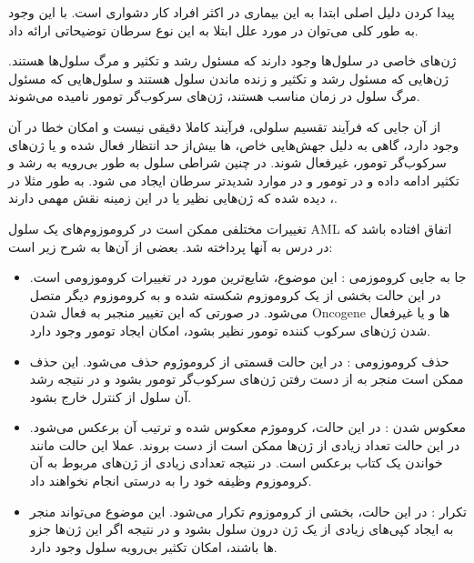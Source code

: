\documentclass[12pt]{article}
\begin{document}
پیدا کردن دلیل اصلی ابتدا به این بیماری در اکثر افراد کار دشواری است. با این وجود به طور کلی می‌توان در مورد علل ابتلا به این نوع سرطان توضیحاتی ارائه داد.

ژن‌های خاصی در سلول‌ها وجود دارند که مسئول رشد و تکثیر و مرگ سلول‌ها هستند. ژن‌هایی که مسئول رشد و تکثیر و زنده ماندن سلول هستند  و سلول‌هایی که مسئول مرگ سلول در زمان مناسب هستند، ژن‌های سرکوب‌گر تومور
نامیده می‌شوند.

از آن جایی که فرآیند تقسیم سلولی،  فرآیند کاملا دقیقی نیست و امکان خطا در آن وجود دارد، گاهی به دلیل جهش‌هایی خاص،  ها بیش‌از حد انتظار فعال شده و یا ژن‌های سرکوب‌گر تومور، غیرفعال شوند. در چنین شراطی سلول به طور بی‌رویه به رشد و تکثیر ادامه داده و در تومور و در موارد شدیدتر سرطان ایجاد می شود. به طور مثلا در ، دیده شده که ژن‌هایی نظیر  یا  در این زمینه نقش مهمی دارند.


تغییرات مختلفی ممکن است در کروموزوم‌های یک سلول AML اتفاق افتاده باشد که در درس به آنها پرداخته شد. بعضی از آن‌ها به شرح زیر است:

\begin{itemize}
	
	\item جا به جایی کروموزمی
	: این موضوع، شایع‌ترین مورد در تغییرات کروموزومی است. در این حالت بخشی از یک کروموزوم شکسته شده و به کروموزوم دیگر متصل می‌شود. در صورتی که این تغییر منجبر به فعال شدن Oncogene ها و یا غیرفعال شدن ژن‌های سرکوب کننده تومور نظیر  بشود، امکان ایجاد تومور وجود دارد.
	
	\item حذف کروموزومی
	:
	در این حالت قسمتی از کروموژوم حذف می‌شود. این حذف ممکن است منجر به از دست رفتن ژن‌های سرکوب‌گر تومور بشود و در نتیجه رشد آن سلول  از کنترل خارج بشود.
	
	
	\item معکوس شدن
	:
	در این حالت، کروموژم معکوس شده و ترتیب آن برعکس می‌شود. در این حالت تعداد زیادی از ژن‌ها ممکن است از دست بروند. عملا این حالت مانند خواندن یک کتاب برعکس است. در نتیجه تعدادی زیادی از‌ ژن‌های مربوط به آن کروموزوم وظیفه خود را به درستی انجام نخواهند داد.
	
	
	\item تکرار
	: در این حالت، بخشی از کروموزوم تکرار می‌شود. این موضوع می‌تواند منجر به ایجاد کپی‌های زیادی از یک ژن درون سلول بشود و در نتیجه اگر این ژن‌ها جزو  ها باشند، امکان تکثیر بی‌رویه سلول وجود دارد.
	
	  
	  
	
\end{itemize}
\end{document}
